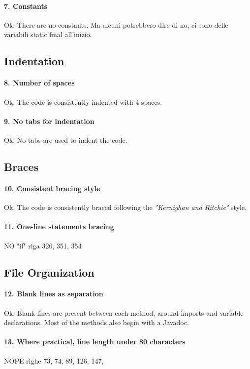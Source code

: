 \documentclass[english]{article}
\begin{document}
\paragraph{7. Constants}
Ok.
There are no constants.
Ma alcuni potrebbero dire di no, ci sono delle variabili static final all'inizio.

\subsection{Indentation}
\paragraph{8. Number of spaces}
Ok.
The code is consistently indented with 4 spaces.

\paragraph{9. No tabs for indentation}
Ok.
No tabs are used to indent the code.

\subsection{Braces}
\paragraph{10. Consistent bracing style}
Ok.
The code is consistently braced following the \textit{"Kernighan and Ritchie"} style.

\paragraph{11. One-line statements bracing}
NO
"if" riga 326, 351, 354

\subsection{File Organization}
\paragraph{12. Blank lines as separation}
Ok.
Blank lines are present between each method, around imports and variable declarations.
Most of the methods also begin with a Javadoc.

\paragraph{13. Where practical, line length under 80 characters}
NOPE
righe 73, 74, 89, 126, 147, 
\end{document}
